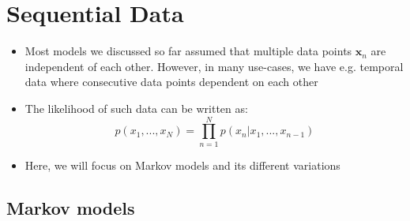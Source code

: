 \section{Sequential Data}
\begin{itemize}
	\item Most models we discussed so far assumed that multiple data points $\bm{x}_n$ are independent of each other. However, in many use-cases, we have e.g. temporal data where consecutive data points dependent on each other
	\item The likelihood of such data can be written as:
	$$p(x_1,...,x_N) = \prod_{n=1}^{N} p(x_n|x_1,...,x_{n-1})$$
	\item Here, we will focus on Markov models and its different variations
\end{itemize}
\subsection{Markov models}

